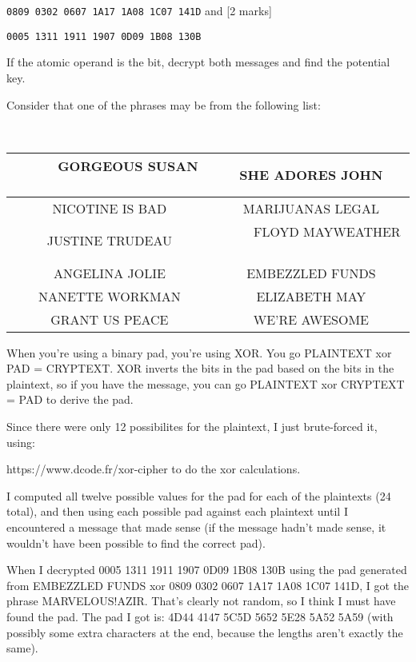 \documentclass[12pt,emtex]{article}
\begin{document}
\begin{enumerate}
\texttt{0809 0302 0607 1A17 1A08 1C07 141D}
	and
	 	 \hfill [2 marks]
	
\texttt{0005 1311 1911 1907 0D09 1B08 130B}

 
  If the atomic operand is the bit, decrypt both messages and find the potential key.

Consider that one of the phrases may be from the following list: 

\

{\footnotesize \begin{center}
\begin{tabular}{|c|c|}  \hline
\ \ \ \ \ GORGEOUS SUSAN \ \ \ \ \ 
&
SHE ADORES JOHN
\\ \hline
NICOTINE IS BAD
&
MARIJUANAS LEGAL
\\ \hline
JUSTINE TRUDEAU
&
\ \ \ \ \ FLOYD MAYWEATHER \ \ \ \ \ 
\\ \hline
ANGELINA JOLIE
&
EMBEZZLED FUNDS \\ \hline
NANETTE WORKMAN
&
ELIZABETH MAY
\\ \hline
GRANT US PEACE
&
WE'RE AWESOME \\  \hline
\end{tabular}
\end{center}
}

When you're using a binary pad, you're using XOR. You go PLAINTEXT xor PAD = CRYPTEXT. XOR inverts the bits in the pad based on the bits in the plaintext, so if you have the message, you can go PLAINTEXT xor CRYPTEXT = PAD to derive the pad. 

Since there were only 12 possibilites for the plaintext, I just brute-forced it, using:

https://www.dcode.fr/xor-cipher to do the xor calculations.

I computed all twelve possible values for the pad for each of the plaintexts (24 total), and then using each possible pad against each plaintext until I encountered a message that made sense (if the message hadn't made sense, it wouldn't have been possible to find the correct pad).

When I decrypted 0005 1311 1911 1907 0D09 1B08 130B using the pad generated from EMBEZZLED FUNDS xor 0809 0302 0607 1A17 1A08 1C07 141D, I got the phrase MARVELOUS!AZIR. That's clearly not random, so I think I must have found the pad. The pad I got is: 4D44 4147 5C5D 5652 5E28 5A52 5A59 (with possibly some extra characters at the end, because the lengths aren't exactly the same).

\newpage





\end{enumerate}
\end{document}
